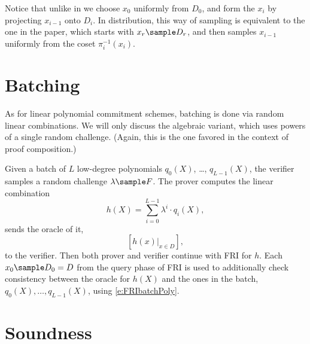 \documentclass[11pt,article,oneside]{memoir}
\theoremstyle{definition}
\theoremstyle{remark}
\begin{document}
Notice that unlike in \cite{ProximityGaps} we choose $x_0$ uniformly from $D_0$, and form the $x_i$ by projecting $x_{i-1}$ onto $D_i$. 
In distribution, this way of sampling is equivalent to the one in the paper, which starts with $x_r\sample D_r$,  and then samples $x_{i-1}$ uniformly from the coset  $\pi_i^{-1}(x_i)$.

\section{Batching}
As for linear polynomial commitment schemes, batching is done via random linear combinations. 
We will only discuss the algebraic variant, which uses powers of a single random challenge. 
(Again, this is the one favored in the context of proof composition.)

Given a batch of $L$ low-degree polynomials $q_0(X)$, \ldots, $q_{L-1}(X)$, the verifier samples a random challenge $\lambda\sample F$. 
The prover computes the linear combination
\begin{equation}
\label{e:FRIbatchPoly}
h(X) = \sum_{i=0}^{L-1} \lambda^i\cdot q_i(X),
\end{equation}
sends the oracle of it,
\[
[h(x)|_{x\in D}],
\]
to the verifier.
Then both prover and verifier continue with FRI for $h$. 
Each $x_0\sample D_0=D$ from the query phase of FRI is used to additionally check consistency between the oracle for $h(X)$ and the ones in the batch, $q_0(X),\ldots, q_{L-1}(X)$, using \eqref{e:FRIbatchPoly}. 


\section{Soundness}





\end{document}

